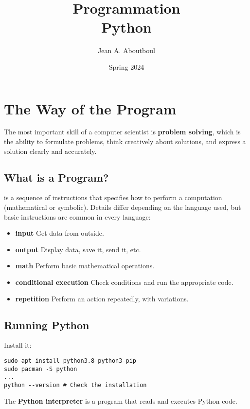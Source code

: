 \documentclass{report}
\title{\Huge{Programmation }\\Python}
\author{\huge{Jean A. Aboutboul}}
\date{Spring 2024}
\begin{document}
\maketitle
\newpage%
\tableofcontents
\pagebreak
\chapter{The Way of the Program}

The most important skill of a computer scientist is \textbf{problem solving}, which is the ability to formulate problems, think creatively about solutions, and express a solution clearly and accurately.

\section{What is a Program?}

 is a sequence of instructions that specifies how to perform a computation (mathematical or symbolic). Details differ depending on the language used, but basic instructions are common in every language:

\begin{itemize}
\item \textbf{input} Get data from outside.
\item \textbf{output} Display data, save it, send it, etc.
\item \textbf{math} Perform basic mathematical operations.
\item \textbf{conditional execution} Check conditions and run the appropriate code.
\item \textbf{repetition} Perform an action repeatedly, with variations.
\end{itemize}

\section{Running Python}

Install it:

\begin{verbatim}
sudo apt install python3.8 python3-pip
sudo pacman -S python
...
python --version # Check the installation
\end{verbatim}

The \textbf{Python interpreter} is a program that reads and executes Python code.
\end{document}
